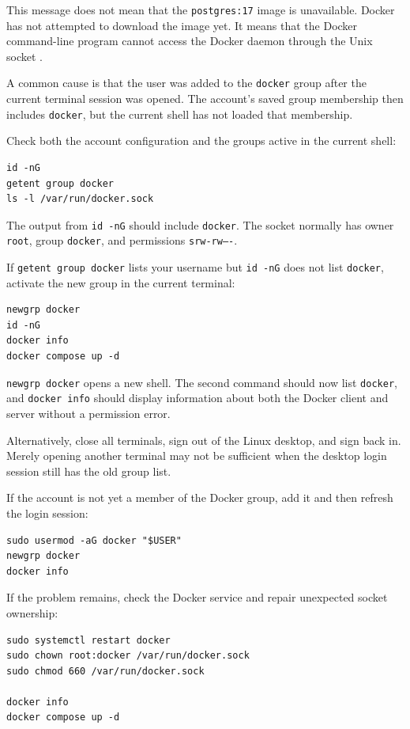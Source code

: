 \documentclass[11pt,a4paper]{article}
\newcommand{\filename}[1]{\texttt{\detokenize{#1}}}
\begin{document}
This message does not mean that the \texttt{postgres:17} image is unavailable.
Docker has not attempted to download the image yet. It means that the Docker
command-line program cannot access the Docker daemon through the Unix socket
\filename{/var/run/docker.sock}.

A common cause is that the user was added to the \texttt{docker} group after
the current terminal session was opened. The account's saved group membership
then includes \texttt{docker}, but the current shell has not loaded that
membership.

Check both the account configuration and the groups active in the current
shell:

\begin{lstlisting}[style=terminal]
id -nG
getent group docker
ls -l /var/run/docker.sock
\end{lstlisting}

The output from \texttt{id -nG} should include \texttt{docker}. The socket
normally has owner \texttt{root}, group \texttt{docker}, and permissions
\texttt{srw-rw----}.

If \texttt{getent group docker} lists your username but \texttt{id -nG} does
not list \texttt{docker}, activate the new group in the current terminal:

\begin{lstlisting}[style=terminal]
newgrp docker
id -nG
docker info
docker compose up -d
\end{lstlisting}

\texttt{newgrp docker} opens a new shell. The second command should now list
\texttt{docker}, and \texttt{docker info} should display information about
both the Docker client and server without a permission error.

Alternatively, close all terminals, sign out of the Linux desktop, and sign
back in. Merely opening another terminal may not be sufficient when the
desktop login session still has the old group list.

If the account is not yet a member of the Docker group, add it and then refresh
the login session:

\begin{lstlisting}[style=terminal]
sudo usermod -aG docker "$USER"
newgrp docker
docker info
\end{lstlisting}

If the problem remains, check the Docker service and repair unexpected socket
ownership:

\begin{lstlisting}[style=terminal]
sudo systemctl restart docker
sudo chown root:docker /var/run/docker.sock
sudo chmod 660 /var/run/docker.sock

docker info
docker compose up -d
\end{lstlisting}
\end{document}
